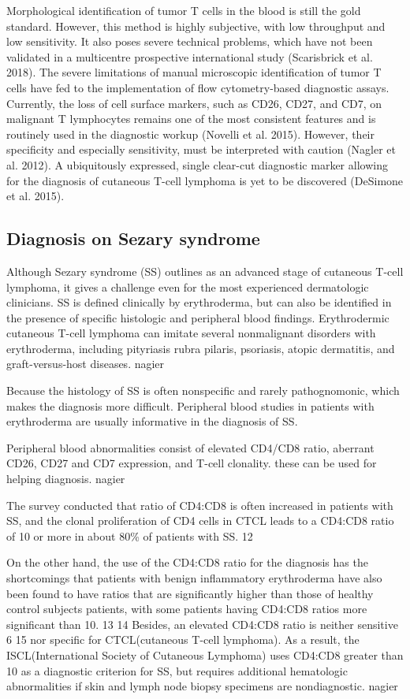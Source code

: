 Morphological identification of tumor T cells in the blood is still the gold standard. However, this method is highly subjective, with low throughput and low sensitivity. It also poses severe technical problems, which have not been validated in a multicentre prospective international study (Scarisbrick et al. 2018). The severe limitations of manual microscopic identification of tumor T cells have fed to the implementation of flow cytometry-based diagnostic assays. Currently, the loss of cell surface markers, such as CD26, CD27, and CD7, on malignant T lymphocytes remains one of the most consistent features and is routinely used in the diagnostic workup (Novelli et al. 2015). However, their specificity and especially sensitivity, must be interpreted with caution (Nagler et al. 2012). A ubiquitously expressed, single clear-cut diagnostic marker allowing for the diagnosis of cutaneous T-cell lymphoma is yet to be discovered (DeSimone et al. 2015).



\subsection{ Diagnosis on Sezary syndrome}

Although Sezary syndrome (SS) outlines as an advanced stage of cutaneous T-cell lymphoma, it gives a challenge even for the most experienced dermatologic clinicians. SS is defined clinically by erythroderma, but can also be identified in the presence of specific histologic and peripheral blood findings. Erythrodermic cutaneous T-cell lymphoma can imitate several nonmalignant disorders with erythroderma, including pityriasis rubra pilaris, psoriasis, atopic dermatitis, and graft-versus-host diseases. nagier 
 
 Because the histology of SS is often nonspecific and rarely pathognomonic, which makes the diagnosis more difficult. Peripheral blood studies in patients with erythroderma are usually informative in the diagnosis of SS. 

Peripheral blood abnormalities consist of elevated CD4/CD8 ratio, aberrant CD26, CD27 and CD7 expression, and T-cell clonality. these can be used for helping diagnosis.  nagier

The survey conducted  that ratio of CD4:CD8 is often increased in patients with SS, and the clonal proliferation of CD4 cells in CTCL leads to a CD4:CD8 ratio of 10 or more in about 80\% of patients with SS. 12 

On the other hand, the use of the CD4:CD8 ratio for the diagnosis has the shortcomings that patients with benign inflammatory erythroderma have also been found to have ratios that are significantly higher than those of healthy control subjects patients, with some patients having CD4:CD8 ratios more significant than 10. 13 14
Besides, an elevated CD4:CD8 ratio is neither sensitive  6 15  nor specific for CTCL(cutaneous T-cell lymphoma). As a result, the ISCL(International Society of Cutaneous Lymphoma) uses CD4:CD8 greater than 10 as a diagnostic criterion for SS, but requires additional hematologic abnormalities if skin and lymph node biopsy specimens are nondiagnostic.   nagier 


